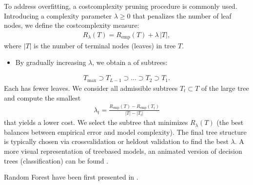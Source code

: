 \documentclass[letterpaper,10pt,english]{jupyterBook}
\begin{document}
\sphinxAtStartPar
To address overfitting, a cost\sphinxhyphen{}complexity pruning procedure is commonly used. Introducing a complexity parameter \(\lambda \ge 0\) that penalizes the number of leaf nodes, we define the cost\sphinxhyphen{}complexity measure:
\begin{equation*}
\begin{split}
R_{\lambda}(T) = R_{\mathrm{emp}}(T) + \lambda \, |T|,
\end{split}
\end{equation*}
\sphinxAtStartPar
where \(|T|\) is the number of terminal nodes (leaves) in tree \(T\).
\begin{itemize}
\item {} 
\sphinxAtStartPar
By gradually increasing \(\lambda\), we obtain a  of subtrees:

\end{itemize}
\begin{equation*}
\begin{split}
T_{\max} \supset T_{L-1} \supset \dots \supset T_2 \supset T_1.
\end{split}
\end{equation*}
\sphinxAtStartPar
Each has fewer leaves. We consider all admissible subtrees \(T_t \subset T\) of the large tree and compute the smallest
\begin{equation*}
\begin{split}
\lambda_t = \frac{R_{\mathrm{emp}}(T) - R_{\mathrm{emp}}(T_t)}{|T| - |T_t|}
\end{split}
\end{equation*}
\sphinxAtStartPar
that yields a lower cost. We select the subtree that minimizes \(R_{\lambda}(T)\) (the best balances between empirical error and model complexity).
The final tree structure is typically chosen via cross\sphinxhyphen{}validation or held\sphinxhyphen{}out validation to find the best \(\lambda\).
A more visual representation of tree\sphinxhyphen{}based models, an animated version of decision trees (classification) can be found .

\begin{sphinxShadowBox}
\sphinxstylesidebartitle{}

\sphinxAtStartPar
Random Forest have been first presented in .
\end{sphinxShadowBox}
\end{document}
